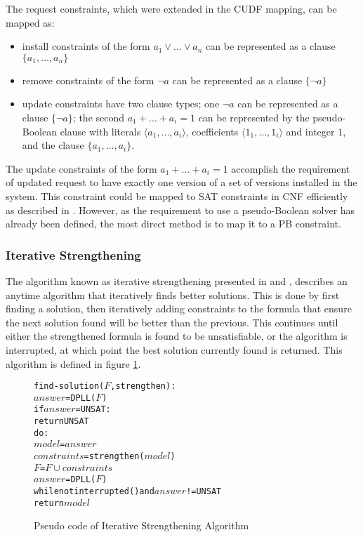 The request constraints, which were extended in the CUDF mapping, can be mapped as:
\begin{itemize}
      \item install constraints of the form $a_1 \vee \ldots \vee a_n$  can be represented as a clause $\{a_1,\ldots,a_n\}$
      \item remove constraints of the form $\neg a$ can be represented as a clause $\{\neg a\}$
      \item update constraints have two clause types; one $\neg a$ can be represented as a clause $\{\neg a\}$;
      the second $a_1 + \ldots + a_i = 1$ can be represented by the pseudo-Boolean clause with literals $\langle a_1,\ldots,a_i\rangle$, coefficients $\langle 1_1,\ldots,1_i \rangle$
      and integer $1$, and the clause $\{a_1,\ldots,a_i\}$.
\end{itemize}

The update constraints of the form $a_1 + \ldots + a_i = 1$ accomplish the requirement of updated request to have exactly one version of a set of versions installed in the system.
This constraint could be mapped to SAT constraints in CNF efficiently as described in \cite{silva2007}.
However, as the requirement to use a pseudo-Boolean solver has already been defined, the most direct method is to map it to a PB constraint.

\subsubsection{Iterative Strengthening}
The algorithm known as iterative strengthening presented in \cite{calistri1994iterative} and \cite{le2010sat4j}, 
describes an anytime algorithm that iteratively finds better solutions.
This is done by first finding a solution, then iteratively adding constraints to the formula that ensure the next solution found will be better than the previous.
This continues until either the strengthened formula is found to be unsatisfiable, or the algorithm is interrupted, at which point the best solution currently found is returned. 
This algorithm is defined in figure \ref{impl.strength}.

\begin{figure}[htp]
\begin{center}
\begin{alltt}
find-solution(\(F\),strengthen):
    \(answer\) = DPLL(\(F\))
    if \(answer\) = UNSAT:
        return UNSAT
    do:
        \(model\) = \(answer\)
        \(constraints\) = strengthen(\(model\))
        \(F\) = \(F \cup constraints\)
        \(answer\) = DPLL(\(F\))
    while not interrupted() and \(answer\) != UNSAT
    return \(model\) 
\end{alltt}
  \caption{Pseudo code of Iterative Strengthening Algorithm}
  \label{impl.strength}
\end{center}
\end{figure}

